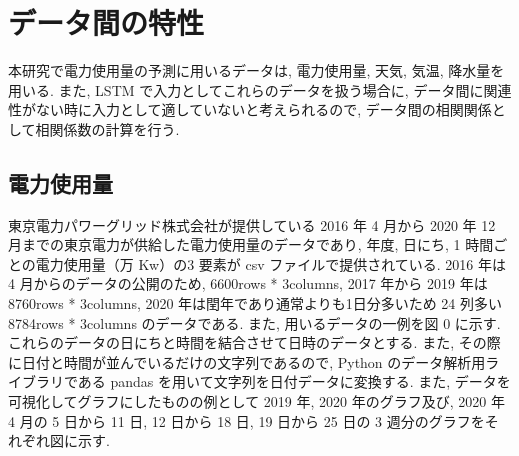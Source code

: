 \section{データ間の特性}
本研究で電力使用量の予測に用いるデータは, 電力使用量, 天気, 気温, 降水量を用いる.
また, LSTM で入力としてこれらのデータを扱う場合に, データ間に関連性がない時に入力として適していないと考えられるので, データ間の相関関係として相関係数の計算を行う.

\subsection{電力使用量}
東京電力パワーグリッド株式会社が提供している 2016 年 4 月から 2020 年 12 月までの東京電力が供給した電力使用量のデータであり, 年度, 日にち, 1 時間ごとの電力使用量（万 Kw）の3 要素が csv ファイルで提供されている.
2016 年は 4 月からのデータの公開のため, 6600rows * 3columns, 2017 年から 2019 年は 8760rows * 3columns, 2020 年は閏年であり通常よりも1日分多いため 24 列多い 8784rows * 3columns のデータである.
また, 用いるデータの一例を図 0 に示す.
これらのデータの日にちと時間を結合させて日時のデータとする. また, その際に日付と時間が並んでいるだけの文字列であるので, Python のデータ解析用ライブラリである pandas を用いて文字列を日付データに変換する.
また, データを可視化してグラフにしたものの例として 2019 年, 2020 年のグラフ及び,
2020 年 4 月の 5 日から 11 日, 12 日から 18 日, 19 日から 25 日の 3 週分のグラフをそれぞれ図に示す.

